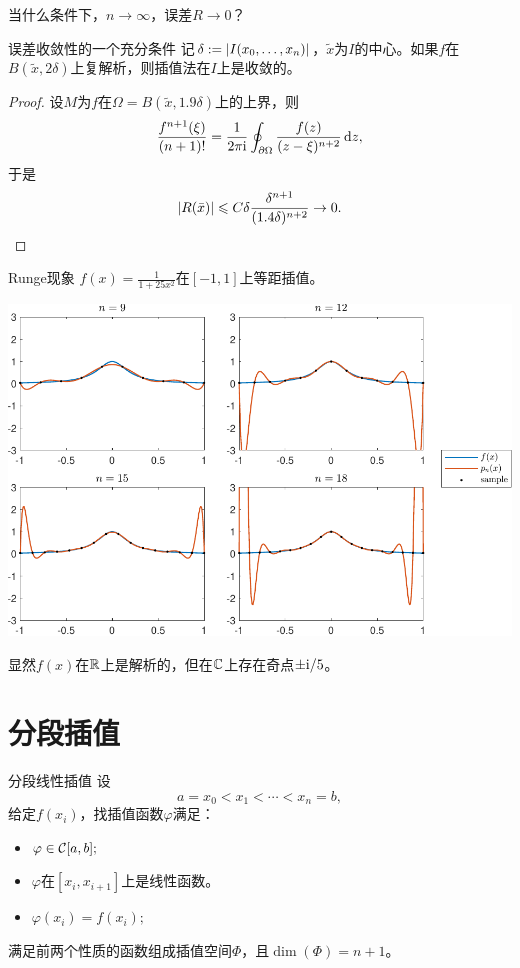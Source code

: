 当什么条件下，$n\to\infty$，误差$R\to 0$？
\begin{theorem}
    {误差收敛性的一个充分条件}{}
    记$\delta:=\left\lvert I(x_0,\ldots,x_n)\right\rvert$，$\tilde x$为$I$的中心。如果$f$在$B(\tilde x,2\delta)$上复解析，则插值法在$I$上是收敛的。
\end{theorem}

\begin{proof}
    设$M$为$f$在$\Omega=B(\tilde x,1.9\delta)$上的上界，则
    \begin{equation}
        \frac{f^{n+1}(\xi)}{(n+1)!}=\frac1{2\pi\mathrm{i}}\oint_{\partial\Omega}\frac{f(z)}{(z-\xi)^{n+2}}\mathop{}\!\mathrm{d} z,
    \end{equation}
    于是
    \begin{equation*}
        \left\lvert R(\bar x)\right\rvert\leqslant C\delta\frac{\delta^{n+1}}{(1.4\delta)^{n+2}}\to 0.
        \qedhere
    \end{equation*}
\end{proof}

\begin{example}
    {Runge现象}{}
    $f(x)=\frac1{1+25x^2}$在$[-1,1]$上等距插值。
    \begin{center}
        \includegraphics[width=0.8\linewidth]{graphs/Runge.pdf}
    \end{center}
    显然$f(x)$在$\mathbb R$上是解析的，但在$\mathbb C$上存在奇点$\pm\mathrm{i}/5$。
\end{example}

\section{分段插值}
\label{sec:piecewise interpolation}

\begin{definition}
    {分段线性插值}{}
    设
    \[
        a=x_0<x_1<\cdots<x_n=b,
    \]
    给定$f(x_i)$，找插值函数$\varphi$满足：
    \begin{itemize}
        \item $\varphi\in\mathcal C[a,b];$
        \item $\varphi$在$[x_i,x_{i+1}]$上是线性函数。
        \item $\varphi(x_i)=f(x_i);$
    \end{itemize}
    满足前两个性质的函数组成插值空间$\Phi$，且$\dim(\Phi)=n+1$。
\end{definition}

